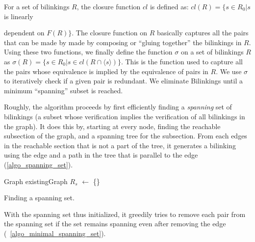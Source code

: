 \documentclass[sigplan,review,nonacm=true]{acmart}
\begin{document}
For a set of bilinkings $R$, the closure function $cl$ is defined as:
$cl(R) = \{ s\in R_0| s$ is linearly {dependent on $F(R) \}$.
%
The closure function on $R$ basically captures all the pairs that can be made by made by composing or ``gluing together'' the bilinkings in $R$. 
%
Using these two functions, we finally define the function $\sigma$ on a set of bilinkings $R$ as
$\sigma(R) = \{s \in R_0 | s\in cl(R\cap \langle s \rangle) \}$.
This is the function used to capture all the pairs whose equivalence is implied by the equivalence of pairs in $R$.
%
We use $\sigma$ to iteratively check if a given pair is redundant.
We eliminate Bilinkings until a minimum ``spanning'' subset is reached.

Roughly, the algorithm proceeds by first efficiently finding a \textit{spanning} set of bilinkings (a subset whose verification implies the verification of all bilinkings in the graph).
It does this by, starting at every node, finding the reachable subsection of the graph, and a spanning tree for the subsection.
From each edges in the reachable section that is not a part of the tree, it generates a bilinking using the edge and a path in the tree that is parallel to the edge (\ref{algo_spanning_set}).

\begin{algorithm}[t]
\label{alg_spanning_set}
\DontPrintSemicolon
{}

Graph existingGraph\;
$R_s$ $\gets$ \{\}\;
\;

\caption{Finding a spanning set.}\label{algo_spanning_set}
\end{algorithm}

With the spanning set thus initialized, it greedily tries to remove each pair from the spanning set if the set remains spanning even after removing the edge (~\ref{algo_minimal_spanning_set}).

\begin{algorithm}[t]
\DontPrintSemicolon
{}



\end{algorithm}}
\end{document}
